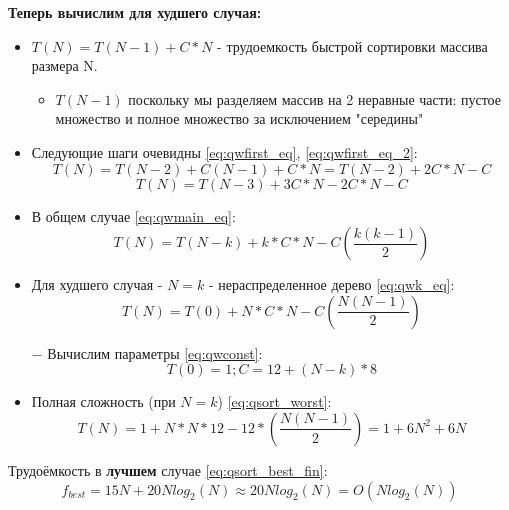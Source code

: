 \textbf{Теперь вычислим для худшего случая:}
\begin{itemize}
    \item $T(N) = T(N - 1) + C*N$ - трудоемкость быстрой сортировки массива размера N.
    \begin{itemize}
        \item $T(N - 1)$ поскольку мы разделяем массив на 2 неравные части: пустое множество и полное множество за исключением "середины"
    \end{itemize}
    \item Следующие шаги очевидны \eqref{eq:qwfirst_eq}, \eqref{eq:qwfirst_eq_2}:
    \begin{equation}
        \label{eq:qwfirst_eq}
        T(N) = T(N-2) + C(N-1) + C*N =  T(N-2) + 2C*N - C
    \end{equation}
    \begin{equation}
        \label{eq:qwfirst_eq_2}
        T(N) = T(N-3) + 3C*N - 2C*N - C
    \end{equation}
    \item В общем случае \eqref{eq:qwmain_eq}:
    \begin{equation}
        \label{eq:qwmain_eq}
        T(N) = T(N-k) + k*C*N - C(\frac{k(k-1)}{2})
    \end{equation}
    \item Для худшего случая - $N = k$ - нераспределенное дерево \eqref{eq:qwk_eq}:
    \begin{equation}
        \label{eq:qwk_eq}
        T(N) = T(0) + N*C*N - C(\frac{N(N-1)}{2})
    \end{equation}
    \item[$-$] Вычислим параметры \eqref{eq:qwconst}:
    \begin{equation}
        \label{eq:qwconst}
        T(0) = 1;
        C = 12 + (N-k) * 8
    \end{equation}
    \item Полная сложность (при $N = k$) \eqref{eq:qsort_worst}:
    \begin{equation}
        \label{eq:qsort_worst}
        T(N) = 1 + N*N*12 - 12*(\frac{N(N-1)}{2}) = 1 + 6N^2 + 6N
    \end{equation}
\end{itemize}

Трудоёмкость в \textbf{лучшем} случае \eqref{eq:qsort_best_fin}:
\begin{equation}
    \label{eq:qsort_best_fin}
    f_{best} = 15N + 20Nlog_2(N) \approx 20Nlog_2(N) = O(Nlog_2(N))
\end{equation}

